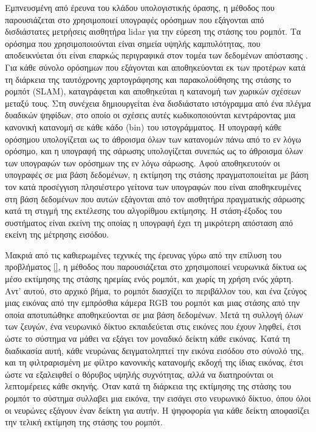 Εμπνευσμένη από έρευνα του κλάδου υπολογιστικής όρασης, η μέθοδος που
παρουσιάζεται στο \cite{Himstedt2014} χρησιμοποιεί υπογραφές ορόσημων που
εξάγονται από δισδιάστατες μετρήσεις αισθητήρα lidar για την εύρεση της στάσης
του ρομπότ.  Τα ορόσημα που χρησιμοποιούνται είναι σημεία υψηλής καμπυλότητας,
που αποδεικνύεται ότι είναι επαρκώς περιγραφικά στον τομέα των δεδομένων
απόστασης \cite{Tipaldi2010}. Για κάθε σύνολο ορόσημων που εξάγονται και
αποθηκεύονται εκ των προτέρων κατά τη διάρκεια της ταυτόχρονης χαρτογράφησης
και παρακολούθησης της στάσης το ρομπότ (SLAM), καταγράφεται και αποθηκεύται η
κατανομή των χωρικών σχέσεων μεταξύ τους. Στη συνέχεια δημιουργείται ένα
δισδιάστατο ιστόγραμμα από ένα πλέγμα δυαδικών ψηφίδων, στο οποίο οι σχέσεις
αυτές κωδικοποιούνται κεντράροντας μια κανονική κατανομή σε κάθε κάδο (bin) του
ιστογράμματος. Η υπογραφή κάθε ορόσημου υπολογίζεται ως το άθροισμα όλων των
κατανομών πάνω από το εν λόγω ορόσημο, και η υπογραφή της σάρωσης υπολογίζεται
συνεπώς ως το άθροισμα όλων των υπογραφών των ορόσημων της εν λόγω σάρωσης.
Αφού αποθηκευτούν οι υπογραφές σε μια βάση δεδομένων, η εκτίμηση της στάσης
πραγματοποιείται με βάση τον κατά προσέγγιση πλησιέστερο γείτονα των υπογραφών
που είναι αποθηκευμένες στη βάση δεδομένων που αυτών εξάγονται από τον
αισθητήρα πραγματικής σάρωσης κατά τη στιγμή της εκτέλεσης του αλγορίθμου
εκτίμησης. Η στάση-έξοδος του συστήματος είναι εκείνη της οποίας η υπογραφή
έχει τη μικρότερη απόσταση από εκείνη της μέτρησης εισόδου.

Μακριά από τις καθιερωμένες τεχνικές της έρευνας γύρω από την επίλυση του
προβλήματος \ref{}, η μέθοδος που παρουσιάζεται στο \cite{Lyrio2014}
χρησιμοποιεί νευρωνικά δίκτυα ως μέσο εκτίμησης της στάσης ηρεμίας ενός ρομπότ,
και χωρίς τη χρήση ενός χάρτη. Αντ' αυτού, στο αρχικό βήμα, το ρομπότ διασχίζει
το περιβάλλον του, και ένα ζεύγος μιας εικόνας από την εμπρόσθια κάμερα RGB του
ρομπότ και μιας στάσης από την οποία αποτυπώθηκε αποθηκεύονται σε μια βάση
δεδομένων. Μετά τη συλλογή όλων των ζευγών, ένα νευρωνικό δίκτυο εκπαιδεύεται
στις εικόνες που έχουν ληφθεί, έτσι ώστε το σύστημα να μάθει να εξάγει τον
μοναδικό δείκτη κάθε εικόνας. Κατά τη διαδικασία αυτή, κάθε νευρώνας
δειγματοληπτεί την εικόνα εισόδου στο σύνολό της, και τη φιλτραρισμένη με
φίλτρο κανονικής κατανομής εκδοχή της ίδιας εικόνας, έτσι ώστε να εξαλειφθεί ο
θόρυβος υψηλής συχνότητας, αλλά να διατηρούνται οι λεπτομέρειες κάθε σκηνής.
Όταν κατά τη διάρκεια της εκτίμησης της στάσης του ρομπότ το σύστημα συλλαβει
μια εικόνα, την εισάγει στο νευρωνικό δίκτυο, όπου όλοι οι νευρώνες εξάγουν
έναν δείκτη για αυτήν. Η ψηφοφορία για κάθε δείκτη αποφασίζει την τελική
εκτίμηση της στάσης του ρομπότ.

